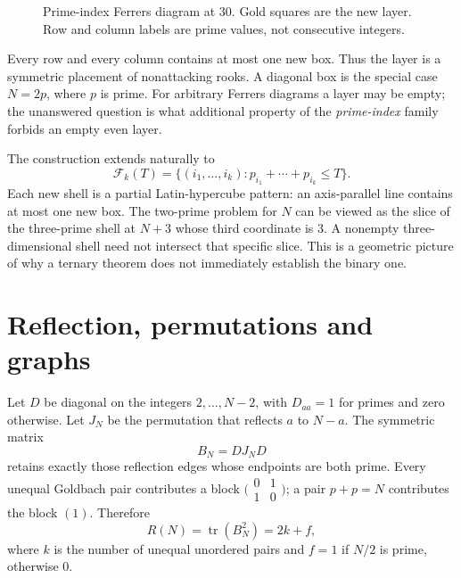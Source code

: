 \documentclass[11pt,a4paper]{article}
\begin{document}
\begin{figure}[htbp]
\centering
{}
\caption{Prime-index Ferrers diagram at $30$. Gold squares are the new layer. Row and column labels are prime values, not consecutive integers.}
\label{fig:ferrers}
\end{figure}

Every row and every column contains at most one new box. Thus the layer is a symmetric placement of nonattacking rooks. A diagonal box is the special case $N=2p$, where $p$ is prime. For arbitrary Ferrers diagrams a layer may be empty; the unanswered question is what additional property of the \emph{prime-index} family forbids an empty even layer.

The construction extends naturally to
\[
 \mathcal F_k(T)=\{(i_1,\ldots,i_k):p_{i_1}+\cdots+p_{i_k}\le T\}.
\]
Each new shell is a partial Latin-hypercube pattern: an axis-parallel line contains at most one new box. The two-prime problem for $N$ can be viewed as the slice of the three-prime shell at $N+3$ whose third coordinate is $3$. A nonempty three-dimensional shell need not intersect that specific slice. This is a geometric picture of why a ternary theorem does not immediately establish the binary one.

\section{Reflection, permutations and graphs}
Let $D$ be diagonal on the integers $2,\ldots,N-2$, with $D_{aa}=1$ for primes and zero otherwise. Let $J_N$ be the permutation that reflects $a$ to $N-a$. The symmetric matrix
\[
 B_N=D J_N D
\]
retains exactly those reflection edges whose endpoints are both prime. Every unequal Goldbach pair contributes a block $\bigl(\begin{smallmatrix}0&1\\1&0\end{smallmatrix}\bigr)$; a pair $p+p=N$ contributes the block $(1)$. Therefore
\begin{equation}\label{eq:trace}
 R(N)=\operatorname{tr}(B_N^2)=2k+f,
\end{equation}
where $k$ is the number of unequal unordered pairs and $f=1$ if $N/2$ is prime, otherwise $0$.
\end{document}
